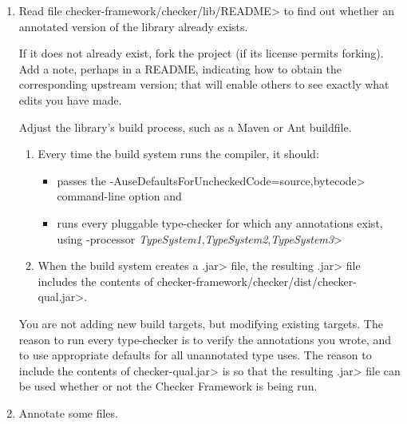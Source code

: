 \begin{enumerate}
\item Read file \<checker-framework/checker/lib/README>
  to find out whether an annotated version of the library already exists.

  If it does not already exist, fork the project (if its license permits
  forking).  Add a note, perhaps in a README, indicating how to obtain the
  corresponding upstream version; that will enable others to see exactly
  what edits you have made.

  Adjust the library's
  build process, such as a Maven or Ant buildfile.
  \begin{sloppypar}
  \begin{enumerate}
  \item
    Every time the build system runs the compiler, it should:
    \begin{itemize}
    \item
      passes the \<-AuseDefaultsForUncheckedCode=source,bytecode>
      command-line option and
    \item
      runs every pluggable type-checker for which any
      annotations exist, using \<-processor
      \emph{TypeSystem1},\emph{TypeSystem2},\emph{TypeSystem3}>
    \end{itemize}
  \item
    When the build system creates a \<.jar> file, the resulting \<.jar>
    file includes the contents of
    \<checker-framework/checker/dist/checker-qual.jar>.
  \end{enumerate}
  \end{sloppypar}

  You are not adding new build targets, but modifying existing targets.
  The reason to run every type-checker is to verify
  the annotations you wrote, and to use appropriate defaults for all
  unannotated type uses.
  The reason to include the contents of \<checker-qual.jar> is so that 
  the resulting \<.jar> file can be used whether or not the Checker Framework
  is being run.

\item Annotate some files.


\end{enumerate}
